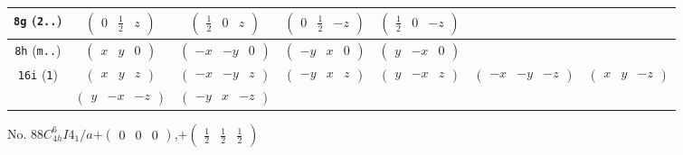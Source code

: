 \documentclass[fleqn,9pt,landscape]{jsarticle}
\begin{document}
\begin{center}
\begin{longtable}{ccccccc}
{\tt 8g} ({\tt 2..}) & $ \begin{pmatrix} 0 & \frac{1}{2} & z \end{pmatrix} $ & $ \begin{pmatrix} \frac{1}{2} & 0 & z \end{pmatrix} $ & $ \begin{pmatrix} 0 & \frac{1}{2} & - z \end{pmatrix} $ & $ \begin{pmatrix} \frac{1}{2} & 0 & - z \end{pmatrix} $ & $  $ & $  $ \\ \hline
{\tt 8h} ({\tt m..}) & $ \begin{pmatrix} x & y & 0 \end{pmatrix} $ & $ \begin{pmatrix} - x & - y & 0 \end{pmatrix} $ & $ \begin{pmatrix} - y & x & 0 \end{pmatrix} $ & $ \begin{pmatrix} y & - x & 0 \end{pmatrix} $ & $  $ & $  $ \\ \hline
{\tt 16i} ({\tt 1}) & $ \begin{pmatrix} x & y & z \end{pmatrix} $ & $ \begin{pmatrix} - x & - y & z \end{pmatrix} $ & $ \begin{pmatrix} - y & x & z \end{pmatrix} $ & $ \begin{pmatrix} y & - x & z \end{pmatrix} $ & $ \begin{pmatrix} - x & - y & - z \end{pmatrix} $ & $ \begin{pmatrix} x & y & - z \end{pmatrix} $ \\
& $ \begin{pmatrix} y & - x & - z \end{pmatrix} $ & $ \begin{pmatrix} - y & x & - z \end{pmatrix} $ & $  $ & $  $ & $  $ & $  $ \\
\end{longtable}
\end{center}
\newpage
No. 88\quad$C_{4h}^{6}$\quad$I4_1/a$\quad[ tetragonal ]\quad$+\begin{pmatrix} 0 & 0 & 0 \end{pmatrix}$,\quad $+\begin{pmatrix} \frac{1}{2} & \frac{1}{2} & \frac{1}{2} \end{pmatrix}$
\end{document}

